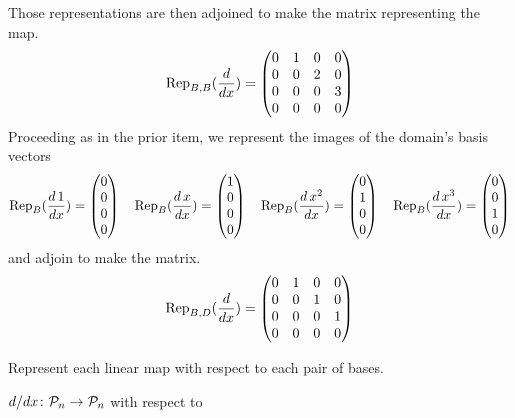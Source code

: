 \begin{exercises}
\begin{answer}
\begin{exparts*}
\begin{equation*}
        \end{equation*}
        Those representations are then adjoined to make the matrix
        representing the map.
        \begin{equation*}
          \rep{\frac{d}{dx}}{B,B}=
          \begin{pmatrix}
            0  &1  &0  &0  \\
            0  &0  &2  &0  \\
            0  &0  &0  &3  \\
            0  &0  &0  &0 
          \end{pmatrix}  
        \end{equation*}
        \partsitem Proceeding as in the prior item, we represent the images
          of the domain's basis vectors
        \begin{equation*}
          \rep{\frac{d\,1}{dx}}{B}=\colvec{0 \\ 0 \\ 0 \\ 0}
          \quad
          \rep{\frac{d\,x}{dx}}{B}=\colvec{1 \\ 0 \\ 0 \\ 0}
          \quad
          \rep{\frac{d\,x^2}{dx}}{B}=\colvec{0 \\ 1 \\ 0 \\ 0}
          \quad
          \rep{\frac{d\,x^3}{dx}}{B}=\colvec{0 \\ 0 \\ 1 \\ 0}
        \end{equation*}
        and adjoin to make the matrix.
        \begin{equation*}
          \rep{\frac{d}{dx}}{B,D}=
          \begin{pmatrix}
            0  &1  &0  &0  \\
            0  &0  &1  &0  \\
            0  &0  &0  &1  \\
            0  &0  &0  &0
          \end{pmatrix}  
        \end{equation*}
      \end{exparts*}  
    \end{answer}
  \recommended \item 
    Represent each linear map with respect to each pair of bases.
    \begin{exparts}
      \partsitem \( \map{d/dx}{\polyspace_n}{\polyspace_n} \) with respect to

\end{exparts}
\end{exercises}

